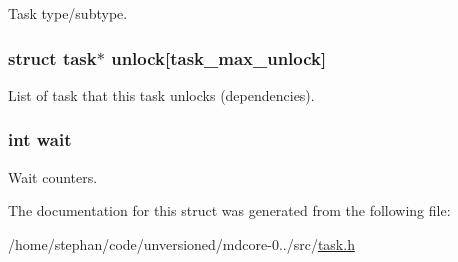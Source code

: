 Task type/subtype. \hypertarget{structtask_a9ea2a7c7ec9d2b1b1bc4ef7a89c6727b}{
\subsubsection[{unlock}]{\setlength{\rightskip}{0pt plus 5cm}struct {\bf task}$\ast$ unlock\mbox{[}{\bf task\-\_\-max\-\_\-unlock}\mbox{]}}}\label{structtask_a9ea2a7c7ec9d2b1b1bc4ef7a89c6727b}
List of task that this task unlocks (dependencies). \hypertarget{structtask_aaefdb10b18059f3c08332338630b3f68}{
\subsubsection[{wait}]{\setlength{\rightskip}{0pt plus 5cm}int wait}}\label{structtask_aaefdb10b18059f3c08332338630b3f68}
Wait counters. 

The documentation for this struct was generated from the following file\-:\begin{DoxyCompactItemize}
\item 
/home/stephan/code/unversioned/mdcore-\/0../src/\hyperlink{task_8h}{task.\-h}\end{DoxyCompactItemize}
